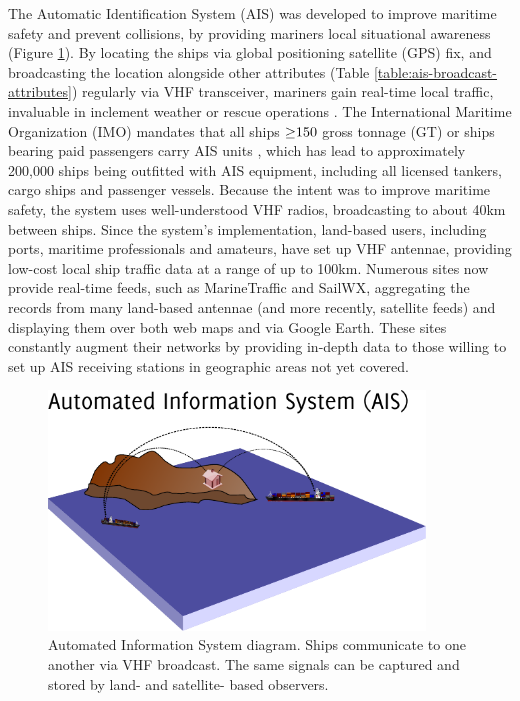 The Automatic Identification System (AIS) \citep{no20041028,Tetreault2002} was developed to improve maritime safety and prevent collisions, by providing mariners local situational awareness (Figure \ref{fig:ais-overview}). By locating the ships via global positioning satellite (GPS) fix, and broadcasting the location alongside other attributes (Table \ref{table:ais-broadcast-attributes}) regularly via VHF transceiver, mariners gain real-time local traffic, invaluable in inclement weather or rescue operations \citep{Itu-r2010}.  The International Maritime Organization (IMO) mandates that all ships $\geq\negthickspace 150$ gross tonnage (GT) or ships bearing paid passengers carry AIS units \citep{solas}, which has lead to approximately 200,000 ships being outfitted with AIS equipment, including all licensed tankers, cargo ships and passenger vessels. Because the intent was to improve maritime safety, the system uses well-understood VHF radios, broadcasting to about 40km between ships. Since the system's implementation, land-based users, including ports, maritime professionals and amateurs, have set up VHF antennae, providing low-cost local ship traffic data at a range of up to 100km. Numerous sites now provide real-time feeds, such as MarineTraffic \citep{MarineTraffic} and SailWX, aggregating the records from many land-based antennae (and more recently, satellite feeds) and displaying them over both web maps and via Google Earth. These sites constantly augment their networks by providing in-depth data to those willing to set up AIS receiving stations in geographic areas not yet covered.

\begin{figure}[htbp]
  \centering
  \includegraphics[width=100mm]{images/towers/drawing.pdf}
  \caption{Automated Information System diagram. Ships communicate to one another via VHF broadcast. The same signals can be captured and stored by land- and satellite- based observers.}
  \label{fig:ais-overview}
\end{figure}

